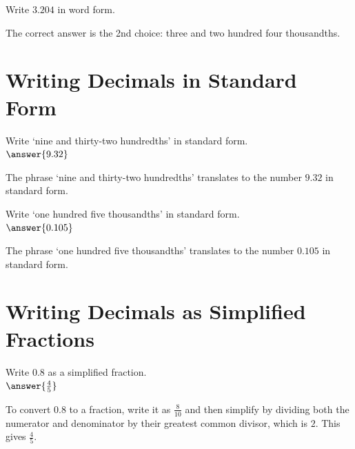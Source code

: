 \documentclass{ximera}
\begin{document}
\begin{problem}
Write $3.204$ in word form.\\
\begin{feedback}
The correct answer is the 2nd choice: three and two hundred four thousandths.
\end{feedback}
\end{problem}

\section*{Writing Decimals in Standard Form}

\begin{problem}
Write `nine and thirty-two hundredths' in standard form.\\
$\answer{9.32}$
\begin{feedback}
The phrase `nine and thirty-two hundredths' translates to the number $9.32$ in standard form.
\end{feedback}
\end{problem}

\begin{problem}
Write `one hundred five thousandths' in standard form.\\
$\answer{0.105}$
\begin{feedback}
The phrase `one hundred five thousandths' translates to the number $0.105$ in standard form.
\end{feedback}
\end{problem}

\section*{Writing Decimals as Simplified Fractions}

\begin{problem}
Write $0.8$ as a simplified fraction.\\
$\answer{\frac{4}{5}}$
\begin{feedback}
To convert $0.8$ to a fraction, write it as $\frac{8}{10}$ and then simplify by dividing both the numerator and denominator by their greatest common divisor, which is $2$. This gives $\frac{4}{5}$.
\end{feedback}
\end{problem}
\end{document}

